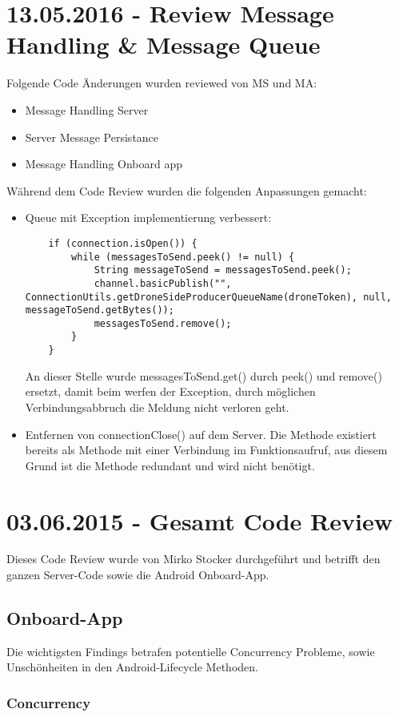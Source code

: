 \section{13.05.2016 - Review Message Handling \& Message Queue}
Folgende Code Änderungen wurden reviewed von MS und MA:
\begin{itemize}
	\item{Message Handling Server}
	\item{Server Message Persistance}
	\item{Message Handling Onboard app}
\end{itemize}
Während dem Code Review wurden die folgenden Anpassungen gemacht:
\begin{itemize}
	\item{Queue mit Exception implementierung verbessert:
	\begin{lstlisting}
    if (connection.isOpen()) {
        while (messagesToSend.peek() != null) {
            String messageToSend = messagesToSend.peek();
            channel.basicPublish("", ConnectionUtils.getDroneSideProducerQueueName(droneToken), null, messageToSend.getBytes());
            messagesToSend.remove();
        }
    }
	\end{lstlisting}
	An dieser Stelle wurde messagesToSend.get() durch peek() und remove() ersetzt, damit beim werfen der Exception, durch möglichen Verbindungsabbruch die Meldung nicht verloren geht.}
	\item{Entfernen von connectionClose() auf dem Server. Die Methode existiert bereits als Methode mit einer Verbindung im Funktionsaufruf, aus diesem Grund ist die Methode redundant und wird nicht benötigt.}
\end{itemize}
\section{03.06.2015 - Gesamt Code Review}

Dieses Code Review wurde von Mirko Stocker durchgeführt und betrifft den ganzen Server-Code sowie die Android Onboard-App.

\subsection{Onboard-App}

Die wichtigsten Findings betrafen potentielle Concurrency Probleme, sowie Unschönheiten in den Android-Lifecycle Methoden.

\subsubsection{Concurrency}

